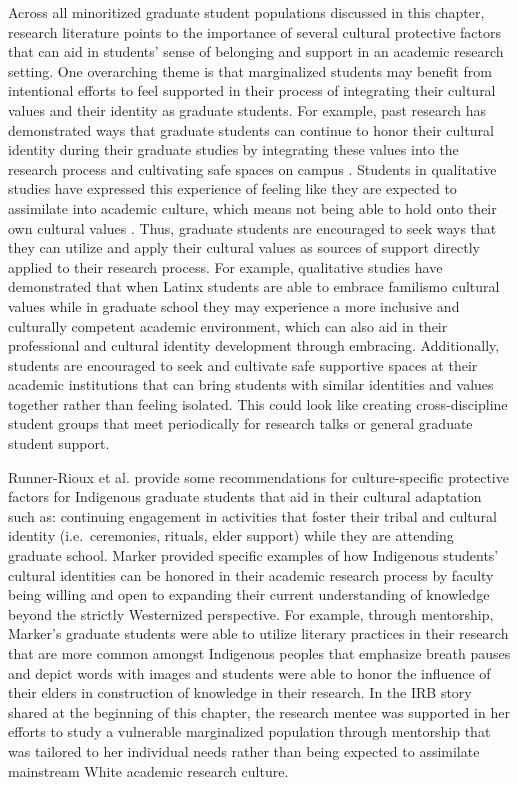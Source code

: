 \documentclass[
  11pt,
]{book}
\begin{document}
Across all minoritized graduate student populations discussed in this chapter, research literature points to the importance of several cultural protective factors that can aid in students' sense of belonging and support in an academic research setting. One overarching theme is that marginalized students may benefit from intentional efforts to feel supported in their process of integrating their cultural values and their identity as graduate students. For example, past research has demonstrated ways that graduate students can continue to honor their cultural identity during their graduate studies by integrating these values into the research process and cultivating safe spaces on campus \citep{knutson_advocating_2022}. Students in qualitative studies have expressed this experience of feeling like they are expected to assimilate into academic culture, which means not being able to hold onto their own cultural values \citep{crumb_fostering_2022}. Thus, graduate students are encouraged to seek ways that they can utilize and apply their cultural values as sources of support directly applied to their research process. For example, qualitative studies have demonstrated that when Latinx students are able to embrace familismo cultural values while in graduate school they may experience a more inclusive and culturally competent academic environment, which can also aid in their professional and cultural identity development through embracing. Additionally, students are encouraged to seek and cultivate safe supportive spaces at their academic institutions that can bring students with similar identities and values together rather than feeling isolated. This could look like creating cross-discipline student groups that meet periodically for research talks or general graduate student support.

Runner-Rioux et al. \citeyearpar{runner-rioux_influence_2018} provide some recommendations for culture-specific protective factors for Indigenous graduate students that aid in their cultural adaptation such as: continuing engagement in activities that foster their tribal and cultural identity (i.e.~ceremonies, rituals, elder support) while they are attending graduate school. Marker \citeyearpar{marker_indigenous_2019} provided specific examples of how Indigenous students' cultural identities can be honored in their academic research process by faculty being willing and open to expanding their current understanding of knowledge beyond the strictly Westernized perspective. For example, through mentorship, Marker's graduate students were able to utilize literary practices in their research that are more common amongst Indigenous peoples that emphasize breath pauses and depict words with images and students were able to honor the influence of their elders in construction of knowledge in their research. In the IRB story shared at the beginning of this chapter, the research mentee was supported in her efforts to study a vulnerable marginalized population through mentorship that was tailored to her individual needs rather than being expected to assimilate mainstream White academic research culture.
\end{document}
